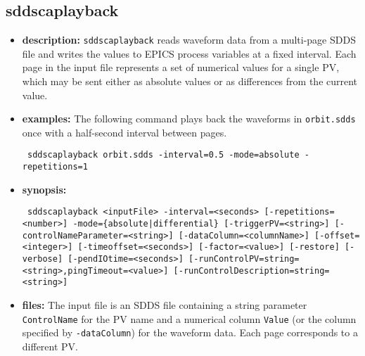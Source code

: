 %
%
\begin{latexonly}
\newpage
\end{latexonly}

\subsection{sddscaplayback}
\label{sddscaplayback}

\begin{itemize}
\item {\bf description:}
\verb+sddscaplayback+ reads waveform data from a multi-page SDDS file and writes the values to
EPICS process variables at a fixed interval. Each page in the input file represents a set of
numerical values for a single PV, which may be sent either as absolute values or as differences
from the current value.

\item {\bf examples:}
The following command plays back the waveforms in \verb+orbit.sdds+ once with a half-second
interval between pages.
\begin{flushleft}{\tt
sddscaplayback orbit.sdds -interval=0.5 -mode=absolute -repetitions=1
}\end{flushleft}

\item {\bf synopsis:}
\begin{flushleft}{\tt
sddscaplayback <inputFile> -interval=<seconds> [-repetitions=<number>]\
-mode=\{absolute|differential\} [-triggerPV=<string>] [-controlNameParameter=<string>]\
[-dataColumn=<columnName>] [-offset=<integer>] [-timeoffset=<seconds>]\
[-factor=<value>] [-restore] [-verbose] [-pendIOtime=<seconds>]\
[-runControlPV=string=<string>,pingTimeout=<value>]\
[-runControlDescription=string=<string>]
}\end{flushleft}

\item {\bf files:}
The input file is an SDDS file containing a string parameter \verb+ControlName+ for the PV name
and a numerical column \verb+Value+ (or the column specified by \verb+-dataColumn+) for the
waveform data. Each page corresponds to a different PV.


\end{itemize}
